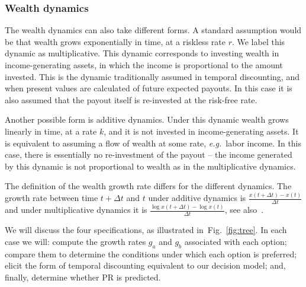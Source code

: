 \documentclass[11pt]{article}
\newcommand{\ie}{{\it i.e.}\ }
\newcommand{\eg}{{\it e.g.}\ }
\newcommand{\fref}[1]{Fig.~\ref{fig:#1}}
\newcommand{\Dt}{\Delta t}
\numberwithin{equation}{section}
\begin{document}

\subsubsection{Wealth dynamics}

The wealth dynamics can also take different forms. A standard assumption would be that wealth grows exponentially in time, at a riskless rate $r$. We label this dynamic as multiplicative. This dynamic corresponds to investing wealth in income-generating assets, in which the income is proportional to the amount invested. This is the dynamic traditionally assumed in temporal discounting, and when present values are calculated of future expected payouts. In this case it is also assumed that the payout itself is re-invested at the risk-free rate.

Another possible form is additive dynamics. Under this dynamic wealth grows linearly in time, at a rate $k$, and it is not invested in income-generating assets. It is equivalent to assuming a flow of wealth at some rate, \eg labor income. In this case, there is essentially no re-investment of the payout -- the income generated by this dynamic is not proportional to wealth as in the multiplicative dynamics.

The definition of the wealth growth rate differs for the different dynamics. The growth rate between time $t+\Dt$ and $t$ under additive dynamics is $\frac{x\left(t+\Dt\right)-x\left(t\right)}{\Dt}$ and under multiplicative dynamics it is $\frac{\log x(t+\Dt)-\log x(t)}{\Dt}$, see also~\citep{peters2016evaluating,peters2018time}.

We will discuss the four specifications, as illustrated in~\fref{tree}. In each case we will: compute the growth rates $g_a$ and $g_b$ associated with each option; compare them to determine the conditions under which each option is preferred; elicit the form of temporal discounting equivalent to our decision model; and, finally, determine whether PR is predicted.
\end{document}
